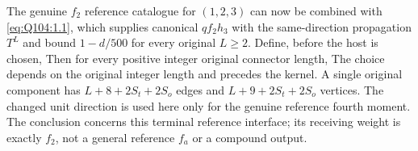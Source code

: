 The genuine $f_2$ reference catalogue for $(1,\allowbreak 2,\allowbreak 3)$ can now be combined
with \eqref{eq:Q104:1.1}, which supplies canonical $qf_2h_3$ with the
same-direction propagation $T^L$ and bound $1-d/500$ for every original
$L\ge\allowbreak 2$. Define, before the host is chosen,
Then for every positive integer original connector length,
The choice depends on the original integer length and precedes the kernel.
A single original component has $L+8+2S_t+2S_o$ edges and
$L+9+2S_t+2S_o$ vertices.
The changed unit direction is used here only for the genuine reference
fourth moment. 
The conclusion concerns this terminal reference interface; its receiving
weight is exactly $f_2$, not a general reference $f_a$ or a compound output.
